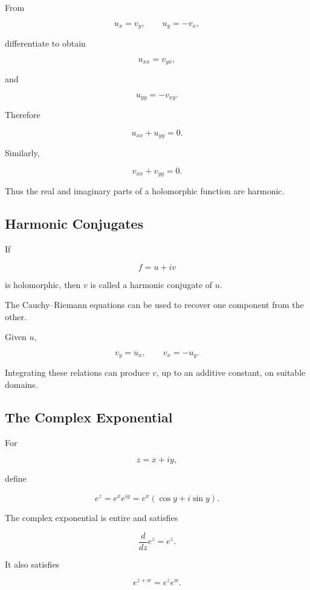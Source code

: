 From

\[
u_x=v_y,
\qquad
u_y=-v_x,
\]

differentiate to obtain

\[
u_{xx}=v_{yx},
\]

and

\[
u_{yy}=-v_{xy}.
\]

Therefore

\[
\boxed{
u_{xx}+u_{yy}=0.
}
\]

Similarly,

\[
\boxed{
v_{xx}+v_{yy}=0.
}
\]

Thus the real and imaginary parts of a holomorphic function are harmonic.

\subsection{Harmonic Conjugates}
\label{subsec:harmonic-conjugates}

If

\[
f=u+iv
\]

is holomorphic, then \(v\) is called a harmonic conjugate of \(u\).

The Cauchy--Riemann equations can be used to recover one component from
the other.

Given \(u\),

\[
v_y=u_x,
\qquad
v_x=-u_y.
\]

Integrating these relations can produce \(v\), up to an additive constant,
on suitable domains.

\subsection{The Complex Exponential}
\label{subsec:complex-exponential}

For

\[
z=x+iy,
\]

define

\[
\boxed{
e^z
=
e^xe^{iy}
=
e^x(\cos y+i\sin y).
}
\]

The complex exponential is entire and satisfies

\[
\boxed{
\frac{d}{dz}e^z=e^z.
}
\]

It also satisfies

\[
\boxed{
e^{z+w}=e^ze^w.
}
\]

